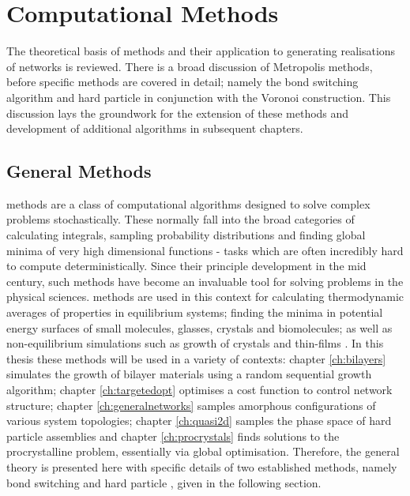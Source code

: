 \chapter{Computational Methods}
\label{ch:compmethods}

\begin{chapterabstract}
The theoretical basis of \mc{} methods and their application to generating realisations of \td{} networks is reviewed.
There is a broad discussion of Metropolis \mc{} methods, before specific methods are covered in detail; namely the bond switching algorithm and hard particle \mc{} in conjunction with the Voronoi construction.
This discussion lays the groundwork for the extension of these methods and development of additional \mc{} algorithms in subsequent chapters.
\end{chapterabstract}

\section{General \mc{} Methods}
\label{sec:mc}

\mc{} methods are a class of computational algorithms designed to solve complex problems stochastically.
These normally fall into the broad categories of calculating integrals, sampling probability distributions and finding global minima of very high dimensional functions \-- tasks which are often incredibly hard to compute deterministically.
Since their principle development in the mid\th{} century, such methods have become an invaluable tool for solving problems in the physical sciences.
\mc{} methods are used in this context for calculating thermodynamic averages of properties in equilibrium systems; finding the minima in potential energy surfaces of small molecules, glasses, crystals and biomolecules; as well as non\--equilibrium simulations such as growth of crystals and thin\--films \cite{Landau2014,Wales1999,Levi1997,Ratsch2003,Kob1999,Jensen1999}.
In this thesis these \mc{} methods  will be used in a variety of contexts: chapter \ref{ch:bilayers} simulates the growth of bilayer materials using  a random sequential growth algorithm; chapter \ref{ch:targetedopt} optimises a cost function to control network structure; chapter \ref{ch:generalnetworks} samples amorphous configurations of various system topologies; chapter \ref{ch:quasi2d} samples the phase space of hard particle assemblies and chapter \ref{ch:procrystals} finds solutions to the procrystalline problem, essentially via global optimisation.
Therefore, the general theory is presented here with specific details of two established methods, namely bond switching and hard particle \mc{}, given in the following section.

